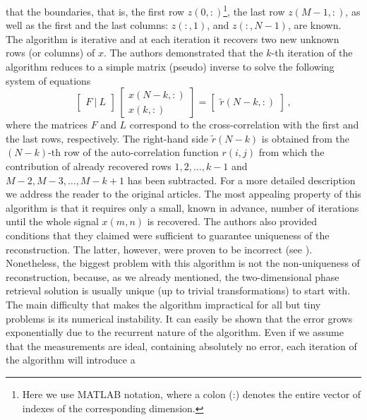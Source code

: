 that the boundaries, that is, the first row $z(0,:)$\footnote{Here we
  use MATLAB notation, where a colon (:) denotes the entire vector of
  indexes of the corresponding dimension.}, the last row $z(M-1,:)$,
as well as the first and the last columns: $z(:,1)$, and $z(:,N-1)$,
are known. The algorithm is iterative and at each iteration it
recovers two new unknown rows (or columns) of $x$. The authors
demonstrated that the $k$-th iteration of the algorithm reduces to a
simple matrix (pseudo) inverse to solve the following system of
equations
\begin{equation}
  \label{eq:boundary-4}
  \left[
    \begin{array}{c}
      F \ \vert\  L
    \end{array}
  \right] \,
  \left[
    \begin{array}{c}
      x(N-k, :)\\
      x(k, :)
    \end{array}
  \right] =
  \left[    
   \begin{array}{c}
      \tilde{r}(N-k, :)
    \end{array}
  \right] \,, 
\end{equation}
where the matrices $F$ and $L$ correspond to the cross-correlation
with the first and the last rows, respectively. The right-hand side
$\tilde{r}(N-k)$ is obtained from the $(N-k)$-th row of the
auto-correlation function $r(i,j)$ from which the contribution of
already recovered rows $1,2,\ldots,k-1$ and $M-2,M-3,\ldots, M-k+1$
has been subtracted. For a more detailed description we address the
reader to the original articles.  The most appealing property of this
algorithm is that it requires only a small, known in advance, number
of iterations until the whole signal $x(m,n)$ is recovered. The authors
also provided conditions that they claimed were sufficient to
guarantee uniqueness of the reconstruction. The latter, however, were
proven to be incorrect (see ). Nonetheless, the biggest
problem with this algorithm is not the non-uniqueness of
reconstruction, because, as we already mentioned, the two-dimensional phase
retrieval solution is usually unique (up to trivial transformations)
to start with. The main difficulty  
that makes the algorithm impractical for all but tiny problems is its
numerical instability. It can easily be shown that the error grows
exponentially due to the recurrent nature of the algorithm. 
Even if we assume that the measurements are ideal, containing
absolutely no error, each iteration of the algorithm will introduce a
